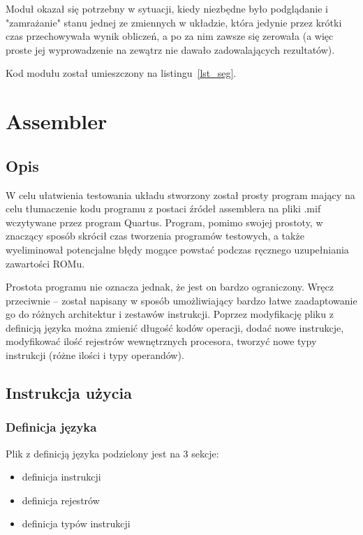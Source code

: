 \documentclass[a4paper,12pt]{report}
\begin{document}
Moduł okazał się potrzebny w sytuacji, kiedy niezbędne było podglądanie i "zamrażanie" stanu jednej ze zmiennych w układzie, która jedynie przez krótki czas przechowywała wynik obliczeń, a po za nim zawsze się zerowała (a więc proste jej wyprowadzenie na zewątrz nie dawało zadowalających rezultatów).

Kod modułu został umieszczony na listingu~\ref{lst_seg}.

\chapter{Assembler}

\section{Opis}

W celu ułatwienia testowania układu stworzony został prosty program mający na celu tłumaczenie kodu programu z postaci źródeł assemblera na pliki .mif wczytywane przez program Quartus. Program, pomimo swojej prostoty, w znaczący sposób skrócił czas tworzenia programów testowych, a także wyeliminował potencjalne błędy mogące powstać podczas ręcznego uzupełniania zawartości ROMu.

Prostota programu nie oznacza jednak, że jest on bardzo ograniczony. Wręcz przeciwnie -- został napisany w sposób umożliwiający bardzo łatwe zaadaptowanie go do różnych architektur i zestawów instrukcji. Poprzez modyfikację pliku z definicją języka można zmienić długość kodów operacji, dodać nowe instrukcje, modyfikować ilość rejestrów wewnętrznych procesora, tworzyć nowe typy instrukcji (różne ilości i typy operandów).

\section{Instrukcja użycia}

\subsection{Definicja języka}

Plik z definicją języka podzielony jest na 3 sekcje:
\begin{itemize}
  \item definicja instrukcji
  \item definicja rejestrów
  \item definicja typów instrukcji
\end{itemize}
\end{document}
